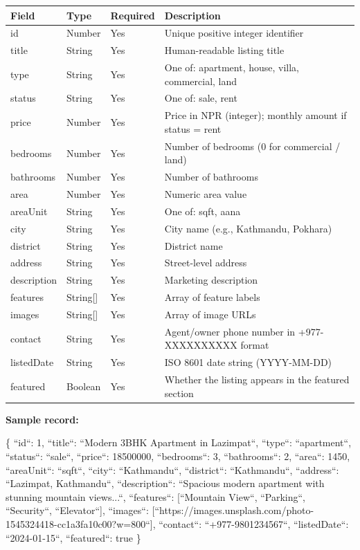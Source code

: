 \documentclass[12pt,a4paper]{report}
\begin{document}
\begin{center}
\begin{tabular}{|l|l|l|l|}
\hline
Field & Type & Required & Description \\
\hline
id & Number & Yes & Unique positive integer identifier \\
\hline
title & String & Yes & Human-readable listing title \\
\hline
type & String & Yes & One of: apartment, house, villa, commercial, land \\
\hline
status & String & Yes & One of: sale, rent \\
\hline
price & Number & Yes & Price in NPR (integer); monthly amount if status = rent \\
\hline
bedrooms & Number & Yes & Number of bedrooms (0 for commercial / land) \\
\hline
bathrooms & Number & Yes & Number of bathrooms \\
\hline
area & Number & Yes & Numeric area value \\
\hline
areaUnit & String & Yes & One of: sqft, aana \\
\hline
city & String & Yes & City name (e.g., Kathmandu, Pokhara) \\
\hline
district & String & Yes & District name \\
\hline
address & String & Yes & Street-level address \\
\hline
description & String & Yes & Marketing description \\
\hline
features & String[] & Yes & Array of feature labels \\
\hline
images & String[] & Yes & Array of image URLs \\
\hline
contact & String & Yes & Agent/owner phone number in +977-XXXXXXXXXX format \\
\hline
listedDate & String & Yes & ISO 8601 date string (YYYY-MM-DD) \\
\hline
featured & Boolean & Yes & Whether the listing appears in the featured section \\
\hline
\end{tabular}
\end{center}

\textbf{Sample record:}

\{
  ``id``: 1,
  ``title``: ``Modern 3BHK Apartment in Lazimpat``,
  ``type``: ``apartment``,
  ``status``: ``sale``,
  ``price``: 18500000,
  ``bedrooms``: 3,
  ``bathrooms``: 2,
  ``area``: 1450,
  ``areaUnit``: ``sqft``,
  ``city``: ``Kathmandu``,
  ``district``: ``Kathmandu``,
  ``address``: ``Lazimpat, Kathmandu``,
  ``description``: ``Spacious modern apartment with stunning mountain views...``,
  ``features``: [``Mountain View``, ``Parking``, ``Security``, ``Elevator``],
  ``images``: [``https://images.unsplash.com/photo-1545324418-cc1a3fa10c00?w=800``],
  ``contact``: ``+977-9801234567``,
  ``listedDate``: ``2024-01-15``,
  ``featured``: true
\}
\end{document}
